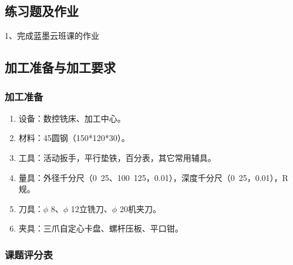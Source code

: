 \subsection{练习题及作业}

1、完成蓝墨云班课的作业


\vfill
\subsection{加工准备与加工要求}
\subsubsection{加工准备}
\begin{enumerate}[1、]
\item 设备：数控铣床、加工中心。
\item 材料：45圆钢（150*120*30）。
\item  工具：活动扳手，平行垫铁，百分表，其它常用辅具。
\item  
量具：外径千分尺（0~25、100~125，0.01），深度千分尺（0~25，0.01），R规。
\item  刀具：$\phi$ 8、$\phi$ 12立铣刀、$\phi$ 20机夹刀。
\item  夹具：三爪自定心卡盘、螺杆压板、平口钳。
\end{enumerate}
\subsubsection{课题评分表}

